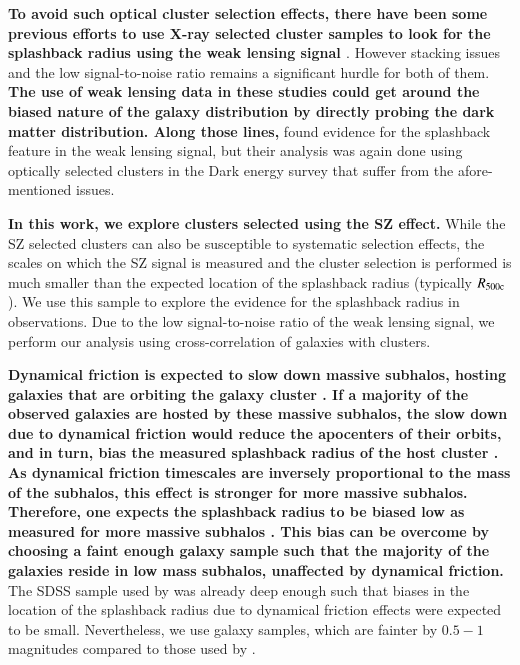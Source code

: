 \documentclass[iop, apjl, twocolappendix, numberedappendix]{emulateapj}
\begin{document}
\textbf{To avoid such optical cluster selection effects, there have been some
previous efforts to use X-ray selected cluster samples to look for the
splashback radius using the weak lensing signal \citep{umetsu2017lensing,
contigiani2018weak}}. However stacking issues and the low signal-to-noise
ratio remains a significant hurdle for both of them. \textbf{The use of weak
lensing data in these studies could get around the biased nature of the galaxy
distribution by directly probing the dark matter distribution. Along those
lines,} \citet{chang2017splashback} found evidence for the splashback feature
in the weak lensing signal, but their analysis was again done using optically
selected clusters in the Dark energy survey that suffer from the
afore-mentioned issues.

\textbf{In this work, we explore clusters selected using the SZ effect.} While
the SZ selected clusters can also be susceptible to systematic selection
effects, the scales on which the SZ signal is measured and the cluster
selection is performed is much smaller than the expected location of the
splashback radius (typically $R_{\rm 500c}$). We use this sample to explore the
evidence for the splashback radius in observations.  Due to the low
signal-to-noise ratio of the weak lensing signal, we perform our analysis using
cross-correlation of galaxies with clusters.

\textbf{Dynamical friction is expected to slow down massive subhalos, hosting
galaxies that are orbiting the galaxy cluster \citep{chandrasekhar1943dynamical}.
If a majority of the observed galaxies are hosted by these massive
subhalos, the slow down due to dynamical friction would reduce the apocenters
of their orbits, and in turn, bias the measured splashback radius of the host
cluster \citep{more2016detection, diemer2017sparta}. As dynamical
friction timescales are inversely proportional to the mass of the subhalos,
this effect is stronger for more massive subhalos. Therefore, one expects the
splashback radius to be biased low as measured for more massive subhalos
\citep{adhikari2016observing}.  This bias can be overcome by choosing a faint
enough galaxy sample such that the majority of the galaxies reside in low mass
subhalos, unaffected by dynamical friction.} The SDSS sample used by
\citet{more2016detection} was already deep enough such that biases in the
location of the splashback radius due to dynamical friction effects were
expected to be small. Nevertheless, we use galaxy samples, which are fainter by
$0.5-1$ magnitudes compared to those used by \citet{more2016detection}.
\end{document}
